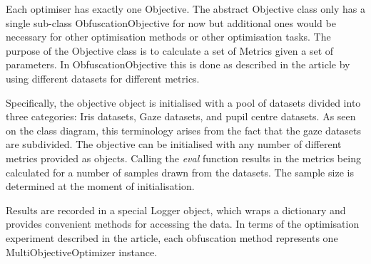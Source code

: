 Each optimiser has exactly one Objective. The abstract Objective class only has a single sub-class ObfuscationObjective for now but additional ones would be necessary for other optimisation methods or other optimisation tasks. The purpose of the Objective class is to calculate a set of Metrics given a set of parameters. In ObfuscationObjective this is done as described in the article by using different datasets for different metrics. 

Specifically, the objective object is initialised with a pool of datasets divided into three categories: Iris datasets, Gaze datasets, and pupil centre datasets. As seen on the class diagram, this terminology arises from the fact that the gaze datasets are subdivided. The objective can be initialised with any number of different metrics provided as objects. Calling the \emph{eval} function results in the metrics being calculated for a number of samples drawn from the datasets. The sample size is determined at the moment of initialisation.

Results are recorded in a special Logger object, which wraps a dictionary and provides convenient methods for accessing the data. In terms of the optimisation experiment described in the article, each obfuscation method represents one MultiObjectiveOptimizer instance.

